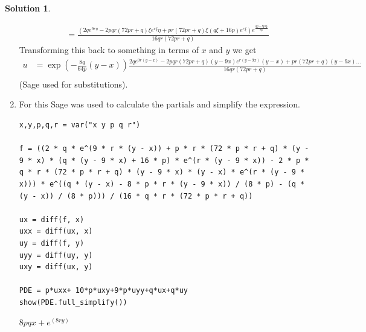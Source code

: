 \documentclass[10pt]{article}
\makeatletter
\theoremstyle{definition}
\newtheorem{soln}{Solution}
\newcommand{\boxspacing}{\kern\kvtcb@left@rule\kern\kvtcb@boxsep}
\newcommand{\prompt}[4]{
    \ttfamily\llap{{\color{#2}[#3]:\hspace{3pt}#4}}\vspace{-\baselineskip}
}
\makeatother
\begin{document}
\begin{soln}
\begin{enumerate}[label=(\alph*)]
\begin{align*}
                                                 & =\frac{\left(2qe^{9r{\eta}} - 2pqr \left(72pr + q\right) {\xi}e^{r{\xi}} {\eta} + pr \left(72pr + q\right) {\xi} \left(q{\xi} + 16p\right) e^{r{\xi}}\right) e^{\frac{q{\eta} - 8pr{\xi}}{8p}}}{16qr \left(72pr + q\right)}
          \end{align*}
          Transforming this back to something in terms of $x$ and $y$ we get
          \begin{align*}
            u & =\exp\left(-\frac{8q}{64p}(y-x)\right)\frac{2qe^{9r{(y-x)}} - 2pqr \left(72pr + q\right) {(y-9x)}e^{r{(y-9x)}} {(y-x)} + pr \left(72pr + q\right) {(y-9x)}\dots}{16qr \left(72pr + q\right)} \\
          \end{align*}
          (Sage used for substitutions).
    \item For this Sage was used to calculate the partials and simplify the expression.
          \begin{tcolorbox}[breakable, size=fbox, boxrule=1pt, pad at break*=1mm,colback=cellbackground, colframe=cellborder]
            \prompt{In}{incolor}{1}{\boxspacing}
            \begin{verbatim}
x,y,p,q,r = var("x y p q r")

f = ((2 * q * e^(9 * r * (y - x)) + p * r * (72 * p * r + q) * (y - 9 * x) * (q * (y - 9 * x) + 16 * p) * e^(r * (y - 9 * x)) - 2 * p * q * r * (72 * p * r + q) * (y - 9 * x) * (y - x) * e^(r * (y - 9 * x))) * e^((q * (y - x) - 8 * p * r * (y - 9 * x)) / (8 * p) - (q * (y - x)) / (8 * p))) / (16 * q * r * (72 * p * r + q))

ux = diff(f, x)
uxx = diff(ux, x)
uy = diff(f, y)
uyy = diff(uy, y)
uxy = diff(ux, y)

PDE = p*uxx+ 10*p*uxy+9*p*uyy+q*ux+q*uy 
show(PDE.full_simplify())
              \end{verbatim}
          \end{tcolorbox}
          \begin{tcolorbox}[breakable, size=fbox, boxrule=.5pt, pad at break*=1mm, opacityfill=0]
            \prompt{Out}{outcolor}{1}{\boxspacing}
            $\displaystyle 8 p q x + e^{\left(8 r y\right)}$
          \end{tcolorbox}
  \end{enumerate}
\end{soln}
\end{document}
